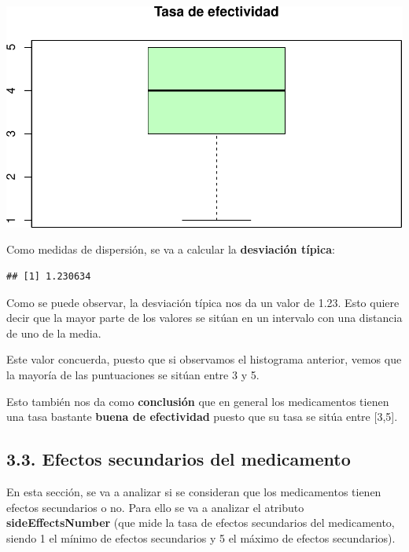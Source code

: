 \documentclass[spanish,]{article}
\newenvironment{Shaded}{\begin{snugshade}}{\end{snugshade}}
\newcommand{\KeywordTok}[1]{\textcolor[rgb]{0.13,0.29,0.53}{\textbf{#1}}}
\newcommand{\CommentTok}[1]{\textcolor[rgb]{0.56,0.35,0.01}{\textit{#1}}}
\newcommand{\OperatorTok}[1]{\textcolor[rgb]{0.81,0.36,0.00}{\textbf{#1}}}
\newcommand{\NormalTok}[1]{#1}
\begin{document}
\includegraphics{practica-original_files/figure-latex/unnamed-chunk-96-1.pdf}

Como medidas de dispersión, se va a calcular la \textbf{desviación
típica}:

\begin{Shaded}
\end{Shaded}

\begin{verbatim}
## [1] 1.230634
\end{verbatim}

Como se puede observar, la desviación típica nos da un valor de 1.23.
Esto quiere decir que la mayor parte de los valores se sitúan en un
intervalo con una distancia de uno de la media.

Este valor concuerda, puesto que si observamos el histograma anterior,
vemos que la mayoría de las puntuaciones se sitúan entre 3 y 5.

Esto también nos da como \textbf{conclusión} que en general los
medicamentos tienen una tasa bastante \textbf{buena de efectividad}
puesto que su tasa se sitúa entre {[}3,5{]}.

\subsection{3.3. Efectos secundarios del
medicamento}\label{efectos-secundarios-del-medicamento}

En esta sección, se va a analizar si se consideran que los medicamentos
tienen efectos secundarios o no. Para ello se va a analizar el atributo
\textbf{sideEffectsNumber} (que mide la tasa de efectos secundarios del
medicamento, siendo 1 el mínimo de efectos secundarios y 5 el máximo de
efectos secundarios).
\end{document}
